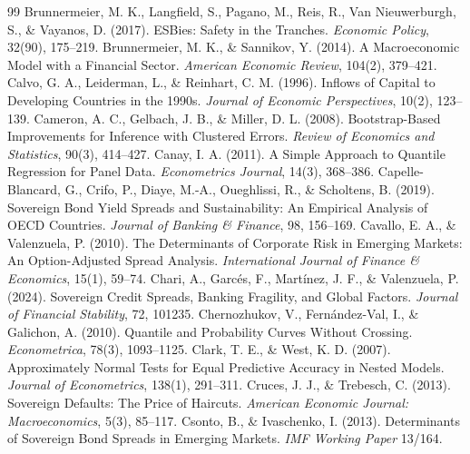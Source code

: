 \begin{thebibliography}{99}
 Brunnermeier, M. K., Langfield, S., Pagano, M., Reis, R., Van Nieuwerburgh, S., \& Vayanos, D. (2017). ESBies: Safety in the Tranches. \textit{Economic Policy}, 32(90), 175--219.
 Brunnermeier, M. K., \& Sannikov, Y. (2014). A Macroeconomic Model with a Financial Sector. \textit{American Economic Review}, 104(2), 379--421.
 Calvo, G. A., Leiderman, L., \& Reinhart, C. M. (1996). Inflows of Capital to Developing Countries in the 1990s. \textit{Journal of Economic Perspectives}, 10(2), 123--139.
 Cameron, A. C., Gelbach, J. B., \& Miller, D. L. (2008). Bootstrap-Based Improvements for Inference with Clustered Errors. \textit{Review of Economics and Statistics}, 90(3), 414--427.
 Canay, I. A. (2011). A Simple Approach to Quantile Regression for Panel Data. \textit{Econometrics Journal}, 14(3), 368--386.
 Capelle-Blancard, G., Crifo, P., Diaye, M.-A., Oueghlissi, R., \& Scholtens, B. (2019). Sovereign Bond Yield Spreads and Sustainability: An Empirical Analysis of OECD Countries. \textit{Journal of Banking \& Finance}, 98, 156--169.
 Cavallo, E. A., \& Valenzuela, P. (2010). The Determinants of Corporate Risk in Emerging Markets: An Option-Adjusted Spread Analysis. \textit{International Journal of Finance \& Economics}, 15(1), 59--74.
 Chari, A., Garcés, F., Martínez, J. F., \& Valenzuela, P. (2024). Sovereign Credit Spreads, Banking Fragility, and Global Factors. \textit{Journal of Financial Stability}, 72, 101235.
 Chernozhukov, V., Fernández-Val, I., \& Galichon, A. (2010). Quantile and Probability Curves Without Crossing. \textit{Econometrica}, 78(3), 1093--1125.
 Clark, T. E., \& West, K. D. (2007). Approximately Normal Tests for Equal Predictive Accuracy in Nested Models. \textit{Journal of Econometrics}, 138(1), 291--311.
 Cruces, J. J., \& Trebesch, C. (2013). Sovereign Defaults: The Price of Haircuts. \textit{American Economic Journal: Macroeconomics}, 5(3), 85--117.
 Csonto, B., \& Ivaschenko, I. (2013). Determinants of Sovereign Bond Spreads in Emerging Markets. \textit{IMF Working Paper} 13/164.

\end{thebibliography}
